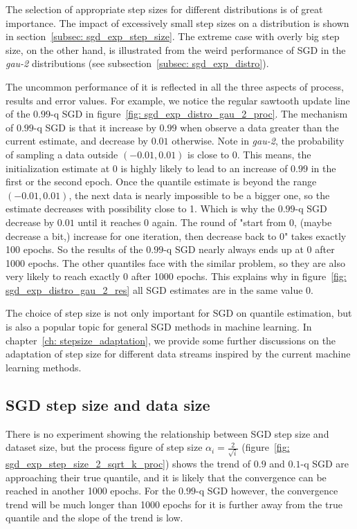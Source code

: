 The selection of appropriate step sizes for different distributions is of great importance. The impact of excessively small step sizes on a distribution is shown in section~\ref{subsec: sgd_exp_step_size}. The extreme case with overly big step size, on the other hand, is illustrated from the weird performance of SGD in the \textit{gau-2} distributions (see subsection~\ref{subsec: sgd_exp_distro}).

The uncommon performance of it is reflected in all the three aspects of process, results and error values. For example, we notice the regular sawtooth update line of the $0.99$-q SGD in figure~\ref{fig: sgd_exp_distro_gau_2_proc}. The mechanism of $0.99$-q SGD is that it increase by $0.99$ when observe a data greater than the current estimate, and decrease by $0.01$ otherwise. Note in \textit{gau-2}, the probability of sampling a data outside $(-0.01, 0.01)$ is close to 0. This means, the initialization estimate at 0 is highly likely to lead to an increase of $0.99$ in the first or the second epoch. Once the quantile estimate is beyond the range $(-0.01, 0.01)$, the next data is nearly impossible to be a bigger one, so the estimate decreases with possibility close to 1. Which is why the $0.99$-q SGD decrease by $0.01$ until it reaches 0 again. The round of "start from 0, (maybe decrease a bit,) increase for one iteration, then decrease back to 0" takes exactly 100 epochs. So the results of the $0.99$-q SGD nearly always ends up at 0 after 1000 epochs. The other quantiles face with the similar problem, so they are also very likely to reach exactly 0 after 1000 epochs. This explains why in figure~\ref{fig: sgd_exp_distro_gau_2_res} all SGD estimates are in the same value $0$. 

The choice of step size is not only important for SGD on quantile estimation, but is also a popular topic for general SGD methods in machine learning. In chapter~\ref{ch: stepsize_adaptation}, we provide some further discussions on the adaptation of step size for different data streams inspired by the current machine learning methods.

\subsection{SGD step size and data size}

There is no experiment showing the relationship between SGD step size and dataset size, but the process figure of step size $\alpha_i = \frac{2}{\sqrt{i}}$ (figure~\ref{fig: sgd_exp_step_size_2_sqrt_k_proc}) shows the trend of $0.9$ and $0.1$-q SGD are approaching their true quantile, and it is likely that the convergence can be reached in another 1000 epochs. For the $0.99$-q SGD however, the convergence trend will be much longer than 1000 epochs for it is further away from the true quantile and the slope of the trend is low.

